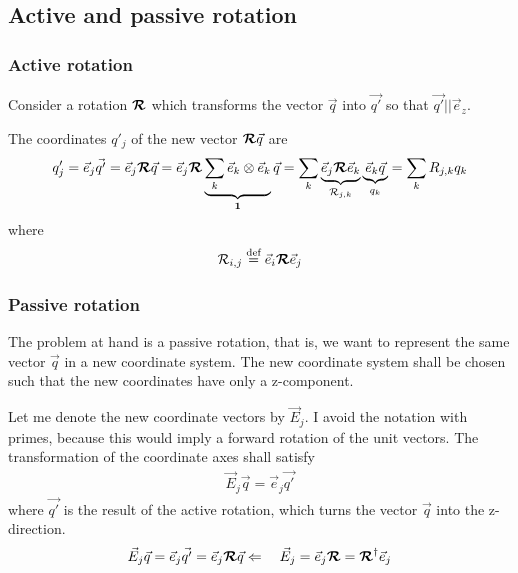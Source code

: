 \documentclass[11pt,a4paper]{report}
\begin{document}
\subsection{Active and passive rotation}
\subsubsection{Active rotation}
Consider a rotation $\bm{\mathcal{R}}$ which transforms the vector
$\vec{q}$ into $\vec{q'}$ so that $\vec{q'}||\vec{e}_z$.

The coordinates $q'_j$ of the new vector $\bm{\mathcal{R}}\vec{q}$ are
\begin{eqnarray}
q'_j=\vec{e}_j\vec{q'}
=\vec{e}_j\bm{\mathcal{R}}\vec{q}
=\vec{e}_j\bm{\mathcal{R}}
\underbrace{\sum_k\vec{e}_k\otimes\vec{e}_k}_{\bm{1}}
\vec{q}
=\sum_k
\underbrace{\vec{e}_j\bm{\mathcal{R}}\vec{e}_k}_{\mathcal{R}_{j,k}}
\underbrace{\vec{e}_k\vec{q}}_{q_k}
=\sum_kR_{j,k} q_k
\end{eqnarray}
where 
\begin{eqnarray}
\mathcal{R}_{i,j}\stackrel{\text{def}}{=}\vec{e}_i\bm{\mathcal{R}}\vec{e}_j
\end{eqnarray}


\subsubsection{Passive rotation}
The problem at hand is a passive rotation, that is, we want to
represent the same vector $\vec{q}$ in a new coordinate system.  The
new coordinate system shall be chosen such that the new coordinates
have only a z-component. 

Let me denote the new coordinate vectors by $\vec{E}_j$. I avoid the notation
with primes, because this would imply a forward rotation of the unit
vectors. The transformation of the coordinate axes shall satisfy
\begin{eqnarray}
\vec{E}_j\vec{q}=\vec{e}_j\vec{q'}
\end{eqnarray}
where $\vec{q'}$ is the result of the active rotation, which turns the
vector $\vec{q}$ into the z-direction.
\begin{eqnarray}
\vec{E}_j\vec{q}=\vec{e}_j\vec{q'}=\vec{e}_j\bm{\mathcal{R}}\vec{q}
\Leftarrow\quad \vec{E}_j
=\vec{e}_j\bm{\mathcal{R}}
=\bm{\mathcal{R}}^\dagger \vec{e}_j
\end{eqnarray}
\end{document}
